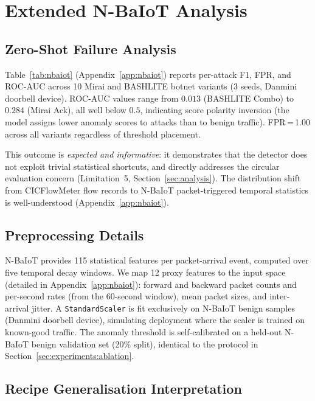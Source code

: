 \section{Extended N-BaIoT Analysis}
\label{app:extended_nbaiot}

\subsection{Zero-Shot Failure Analysis}

Table~\ref{tab:nbaiot} (Appendix~\ref{app:nbaiot}) reports per-attack F1, FPR, and ROC-AUC across
10 Mirai and BASHLITE botnet variants (3 seeds, Danmini doorbell device).
ROC-AUC values range from $0.013$ (BASHLITE Combo) to $0.284$ (Mirai Ack),
all well below $0.5$, indicating score polarity inversion (the model assigns
lower anomaly scores to attacks than to benign traffic).
FPR\,=\,1.00 across all variants regardless of threshold placement.

This outcome is \emph{expected and informative}: it demonstrates that the
detector does not exploit trivial statistical shortcuts, and directly addresses
the circular evaluation concern (Limitation~5, Section~\ref{sec:analysis}).
The distribution shift from CICFlowMeter flow records to N-BaIoT packet-triggered
temporal statistics is well-understood (Appendix~\ref{app:nbaiot}).

\subsection{Preprocessing Details}

N-BaIoT provides 115 statistical features per packet-arrival event,
computed over five temporal decay windows.
We map 12 proxy features to the \ours{} input space (detailed in
Appendix~\ref{app:nbaiot}): forward and backward packet counts and
per-second rates (from the 60-second window), mean packet sizes,
and inter-arrival jitter.
A \texttt{StandardScaler} is fit exclusively on N-BaIoT benign samples
(Danmini doorbell device), simulating deployment where the scaler is
trained on known-good traffic.
The anomaly threshold is self-calibrated on a held-out N-BaIoT benign
validation set (20\% split), identical to the protocol in
Section~\ref{sec:experiments:ablation}.

\subsection{Recipe Generalisation Interpretation}

